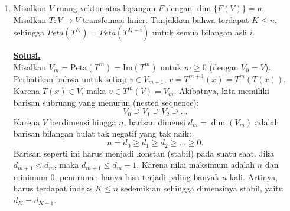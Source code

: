 \documentclass[12pt,twoside]{article}
\newenvironment{solution}
{
	\par\noindent\textbf{\underline{Solusi.}}\\
}
{
	\par
}
\begin{document}
\begin{enumerate}
\begin{solution}
          Kurangkan persamaan kedua dengan persamaan pertama:
          \[ (y_{n+1}^2 - y_n y_{n+2}) - (y_n^2 - y_{n-1}y_{n+1}) = 1 - 1 = 0 \]
          \[ y_{n+1}^2 + y_{n-1}y_{n+1} = y_n^2 + y_n y_{n+2} \]
          Faktorkan:
          \[ y_{n+1}(y_{n+1} + y_{n-1}) = y_n(y_n + y_{n+2}) \]

          Untuk kasus di mana $y_n \ne 0$ dan $y_{n+1} \ne 0$, kita dapat membagi kedua ruas:
          \[ \frac{y_{n+1} + y_{n-1}}{y_n} = \frac{y_{n+2} + y_n}{y_{n+1}}. \]

          Ini menunjukkan bahwa rasio $k_n = \frac{y_{n+1} + y_{n-1}}{y_n}$ adalah konstan untuk setiap $n$ (selama penyebut tidak nol).
          Misalkan konstanta tersebut adalah $c$.
          Maka $y_{n+1} + y_{n-1} = c y_n$, atau
          \[ y_{n+1} = c y_n - y_{n-1}. \]

          Jika ada suatu $y_n=0$, substitusi ke persamaan awal memberikan $-y_{n-1}y_{n+1}=1$, sehingga $y_{n+1}=-1/y_{n-1}$. Juga $y_{n-1}=\pm 1$.
          Persamaan rekurensi menjadi $y_{n+1} = c(0) - y_{n-1} = -y_{n-1}$, yang konsisten dengan kondisi tersebut terlepas dari nilai $c$. Nilai $c$ ditentukan oleh bagian barisan yang tidak nol (jika semua bergantian 0 maka $c=0$).

          Jadi, terbukti terdapat bilangan real $c$ yang memenuhi relasi tersebut.
        \end{solution}

  \item Misalkan $V$ ruang vektor atas lapangan  $F$ dengan $\dim\{F(V)\}=n$. Misalkan $T:V\to V$ transfomasi linier. Tunjukkan bahwa terdapat $K\leq n,$ sehingga $Peta(T^K)=Peta(T^{K+i})$ untuk semua bilangan asli $i$.
        \begin{solution}
          Misalkan $V_m = \text{Peta}(T^m) = \text{Im}(T^m)$ untuk $m \ge 0$ (dengan $V_0=V$).
          Perhatikan bahwa untuk setiap $v \in V_{m+1}$, $v = T^{m+1}(x) = T^m(T(x))$. Karena $T(x) \in V$, maka $v \in T^m(V) = V_m$.
          Akibatnya, kita memiliki barisan subruang yang menurun (nested sequence):
          \[ V_0 \supseteq V_1 \supseteq V_2 \supseteq \dots \]
          Karena $V$ berdimensi hingga $n$, barisan dimensi $d_m = \dim(V_m)$ adalah barisan bilangan bulat tak negatif yang tak naik:
          \[ n = d_0 \ge d_1 \ge d_2 \ge \dots \ge 0. \]
          Barisan seperti ini harus menjadi konstan (stabil) pada suatu saat.
          Jika $d_{m+1} < d_m$, maka $d_{m+1} \le d_m - 1$.
          Karena nilai maksimum adalah $n$ dan minimum 0, penurunan hanya bisa terjadi paling banyak $n$ kali.
          Artinya, harus terdapat indeks $K \le n$ sedemikian sehingga dimensinya stabil, yaitu $d_K = d_{K+1}$.


\end{solution}
\end{enumerate}
\end{document}
